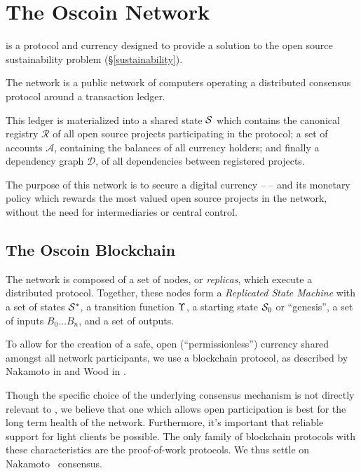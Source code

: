 \section{The Oscoin Network}



\noindent \oscoin{} is a protocol and currency designed to provide a solution
to the open source sustainability problem (\S \ref{sustainability}).

The \oscoin{} network is a public network of computers operating a distributed
consensus protocol around a transaction ledger.

This ledger is materialized into a shared state $\mathcal{S}$ which contains the
canonical registry $\mathcal{R}$ of all open source projects participating in
the \oscoin{} protocol; a set of accounts $\mathcal{A}$, containing the
balances of all currency holders; and finally a  dependency graph
$\mathcal{D}$, of all dependencies between registered projects.

The purpose of this network is to secure a digital currency -- \oscoin{} -- and
its monetary policy which rewards the most valued open source projects in the
network, without the need for intermediaries or central control.

\subsection{The Oscoin Blockchain}

The \oscoin{} network is composed of a set of nodes, or \emph{replicas}, which
execute a distributed protocol. Together, these nodes form a \emph{Replicated
State Machine} with a set of states $\mathcal{S}^*$, a transition function $\Upsilon$,
a starting state $\mathcal{S}_0$ or ``genesis'', a set of inputs $B_0 \dotso B_n$,
and a set of outputs.

To allow for the creation of a safe, open (``permissionless'') currency shared
amongst all network participants, we use a blockchain protocol, as described by
Nakamoto in \cite{bitcoin} and Wood in \cite{ethreum}.

Though the specific choice of the underlying consensus mechanism is not
directly relevant to \oscoin{}, we believe that one which allows open
participation is best for the long term health of the network. Furthermore,
it's important that reliable support for light clients be possible. The only
family of blockchain protocols with these characteristics are the proof-of-work
protocols. We thus settle on Nakamoto~\cite{bitcoin} consensus.

